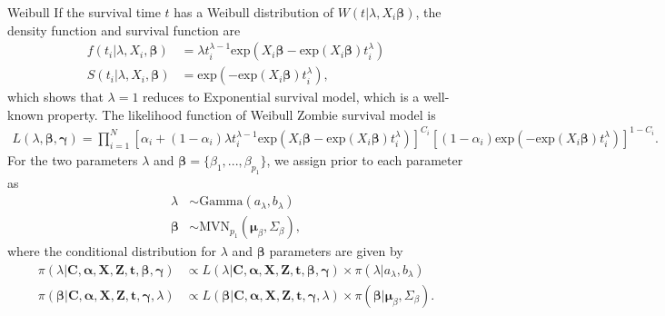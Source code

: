 \documentclass[a4paper, 12pt]{article}
\makeatletter
\newcommand {\dprod}{\displaystyle \prod}
\renewcommand{\subsection}{\@startsection
	{subsection}    {2}    {0mm}    {-0.5\baselineskip}    {0.01\baselineskip}    {\normalfont\normalsize\itshape\center}}
\makeatother
\begin{document}
\subsection{Weibull}
\noindent 
If the survival time $t$ has a Weibull distribution of $W(t|\lambda, X_i\mathbf{\beta})$, the density function and survival function are
\begin{equation}
\begin{aligned}
f(t_i|\lambda, X_i, \mathbf{\beta}) &= \lambda t_i^{\lambda - 1} \mbox{exp}(X_i\mathbf{\beta}-\mbox{exp}(X_i\mathbf{\beta})t_i^{\lambda})\\
S(t_i|\lambda, X_i, \mathbf{\beta}) &= \mbox{exp}(-\mbox{exp}(X_i\mathbf{\beta})t_i^{\lambda}),
\end{aligned}
\end{equation}
which shows that $\lambda=1$ reduces to Exponential survival model, which is a well-known property. The likelihood function of Weibull Zombie survival model is
\begin{equation}
\begin{aligned}
L(\lambda, \mathbf{\beta}, \mathbf{\gamma})=\dprod\limits_{i=1}^{N}[\alpha _{i}+(1-\alpha _{i})\lambda t_i^{\lambda - 1} \mbox{exp}(X_i\mathbf{\beta}-\mbox{exp}(X_i\mathbf{\beta})t_i^{\lambda})]^{C_{i}}[(1-\alpha _{i})\mbox{exp}(-\mbox{exp}(X_i\mathbf{\beta})t_i^{\lambda})]^{1-C_{i}}.
\end{aligned}
\end{equation}
For the two parameters $\lambda$ and $\mathbf{\beta}=\{\beta_1,...,\beta_{p_1}\}$, we assign prior to each parameter as
\begin{equation}
\begin{aligned}
\lambda &\sim \mbox{Gamma}(a_{\lambda}, b_{\lambda})\\
\mathbf{\beta} &\sim \mbox{MVN}_{p_1}(\mathbf{\mu}_{\beta}, \Sigma_{\beta}),
\end{aligned}
\end{equation}
where the conditional distribution for $\lambda$ and $\mathbf{\beta}$ parameters are given by
\begin{equation}
\begin{aligned}
\pi(\lambda|\mathbf{C}, \mathbf{\alpha}, \mathbf{X}, \mathbf{Z}, \mathbf{t}, \mathbf{\beta}, \mathbf{\gamma}) &\propto L(\lambda|\mathbf{C}, \mathbf{\alpha}, \mathbf{X}, \mathbf{Z}, \mathbf{t}, \mathbf{\beta}, \mathbf{\gamma})\times \pi(\lambda|a_{\lambda}, b_{\lambda})\\
\pi(\mathbf{\beta}|\mathbf{C}, \mathbf{\alpha}, \mathbf{X}, \mathbf{Z}, \mathbf{t}, \mathbf{\gamma}, \lambda) &\propto L(\mathbf{\beta}|\mathbf{C}, \mathbf{\alpha}, \mathbf{X}, \mathbf{Z}, \mathbf{t}, \mathbf{\gamma}, \lambda)\times \pi(\mathbf{\beta}|\mathbf{\mu}_{\beta}, \Sigma_{\beta}).
\end{aligned}
\end{equation}
\end{document}
